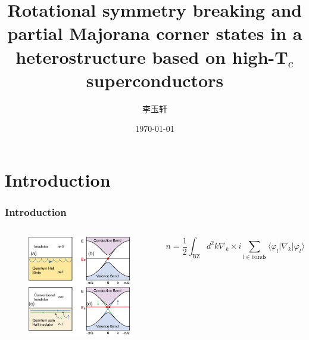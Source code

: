 \documentclass[10pt,aspectratio=169]{beamer} %
\title{Rotational symmetry breaking and partial Majorana corner states in a heterostructure
	based on high-T$_c$ superconductors}
\subtitle{}   %
\author[YuXuan Li]{李玉轩}
\institute[South China Normal University]{\large School of Phisics and\\
Telecommunication Engineering}
\date{\today}
\begin{document}
\maketitle
\section{Introduction}
\begin{frame}
\frametitle{Introduction}
\begin{columns}
\begin{figure}[h]
\flushleft
\includegraphics[scale=0.4]{pic/fig1.png}
\end{figure}
\bigskip
{}
\begin{equation}	
	n=\frac{1}{2}\int_{\mathrm{BZ}}d^2k\nabla_k\times i\sum_{l\in\mathrm{bands}}\langle\varphi_l|\nabla_k|\varphi_l\rangle\label{chern_num}
\end{equation}
\end{columns}
\end{frame}
\end{document}
